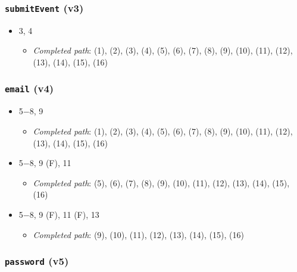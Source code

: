 \documentclass{article}
\newcommand{\completedpath}{\textit{Completed path}}
\begin{document}
\subsubsection*{\texttt{submitEvent} (v3)}

\begin{itemize}
    \item 3, 4
          \begin{itemize}
              \item \completedpath: (1), (2), (3), (4), (5), (6), (7), (8), (9), (10), (11), (12), (13), (14), (15), (16)
          \end{itemize}
\end{itemize}

\subsubsection*{\texttt{email} (v4)}

\begin{itemize}
    \item 5$-$8, 9
          \begin{itemize}
              \item \completedpath: (1), (2), (3), (4), (5), (6), (7), (8), (9), (10), (11), (12), (13), (14), (15), (16)
          \end{itemize}
    \item 5$-$8, 9 (F), 11
          \begin{itemize}
              \item \completedpath: (5), (6), (7), (8), (9), (10), (11), (12), (13), (14), (15), (16)
          \end{itemize}
    \item 5$-8$, 9 (F), 11 (F), 13
          \begin{itemize}
              \item \completedpath: (9), (10), (11), (12), (13), (14), (15), (16)
          \end{itemize}
\end{itemize}

\subsubsection*{\texttt{password} (v5)}
\end{document}
